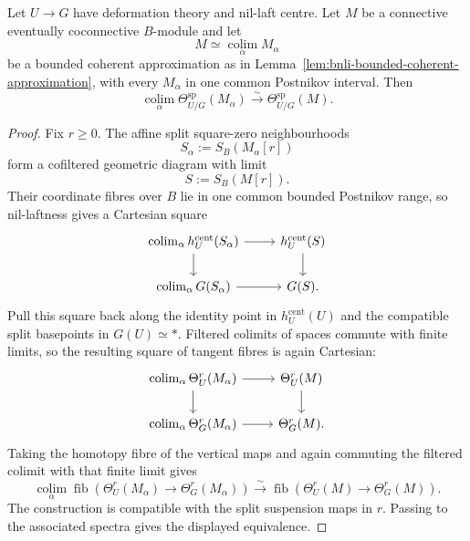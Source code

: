 \begin{lemma}
\label{lem:bnli-relative-split-tangent-continuity}
Let $U\to G$ have deformation theory and nil-laft centre.  Let $M$ be a
connective eventually coconnective $B$-module and let
\[
    M\simeq\operatorname*{colim}_{\alpha}M_\alpha
\]
be a bounded coherent approximation as in
Lemma~\ref{lem:bnli-bounded-coherent-approximation}, with every
$M_\alpha$ in one common Postnikov interval.  Then
\[
\boxed{
    \operatorname*{colim}_{\alpha}
    \Theta_{U/G}^{\mathrm{sp}}(M_\alpha)
    \xrightarrow{\sim}
    \Theta_{U/G}^{\mathrm{sp}}(M).}
\]
\end{lemma}

\begin{proof}
Fix $r\geq0$.  The affine split square-zero neighbourhoods
\[
    S_\alpha:=S_B(M_\alpha[r])
\]
form a cofiltered geometric diagram with limit
\[
    S:=S_B(M[r]).
\]
Their coordinate fibres over $B$ lie in one common bounded Postnikov range,
so nil-laftness gives a Cartesian square
\[
\begin{tikzcd}
\operatorname*{colim}_\alpha h_U^{\mathrm{cent}}(S_\alpha)
    \arrow[r] \arrow[d] &
h_U^{\mathrm{cent}}(S) \arrow[d]\\
\operatorname*{colim}_\alpha G(S_\alpha)
    \arrow[r] &
G(S).
\end{tikzcd}
\]
Pull this square back along the identity point in
$h_U^{\mathrm{cent}}(U)$ and the compatible
split basepoints in $G(U)\simeq *$.  Filtered colimits of spaces commute with
finite limits, so the resulting square of tangent fibres is again Cartesian:
\[
\begin{tikzcd}
\operatorname*{colim}_\alpha \Theta_U^r(M_\alpha)
    \arrow[r] \arrow[d] &
\Theta_U^r(M) \arrow[d]\\
\operatorname*{colim}_\alpha \Theta_G^r(M_\alpha)
    \arrow[r] &
\Theta_G^r(M).
\end{tikzcd}
\]
Taking the homotopy fibre of the vertical maps and again commuting the
filtered colimit with that finite limit gives
\[
    \operatorname*{colim}_\alpha
    \operatorname{fib}
    \left(
      \Theta_U^r(M_\alpha)\to\Theta_G^r(M_\alpha)
    \right)
    \xrightarrow{\sim}
    \operatorname{fib}
    \left(
      \Theta_U^r(M)\to\Theta_G^r(M)
    \right).
\]
The construction is compatible with the split suspension maps in $r$.
Passing to the associated spectra gives the displayed equivalence.
\end{proof}

